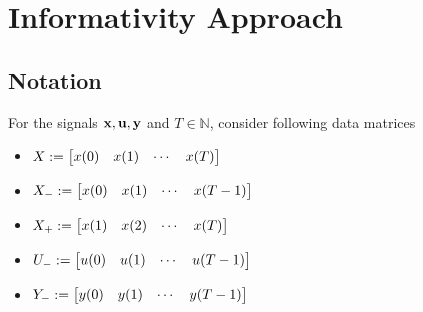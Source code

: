 \chapter{Informativity Approach}\doublespacing %
\label{chap:informativityapproach} %
\section*{Notation}
For the signals $\mathbf{x}, \mathbf{u}, \mathbf{y}$ and $T\in\mathbb{N}$, consider following data matrices
	\begin{itemize}
	\item $X := \begin{bmatrix} x(0) & x(1) & \cdots & x(T)\end{bmatrix}$
	\item $X_- := \begin{bmatrix} x(0) & x(1) & \cdots & x(T-1) \end{bmatrix}$
	\item $X_+ := \begin{bmatrix} x(1) & x(2) & \cdots & x(T) \end{bmatrix}$
	\item $U_- := \begin{bmatrix} u(0) & u(1) & \cdots & u(T-1)\end{bmatrix}$
	\item $Y_- := \begin{bmatrix} y(0) & y(1) & \cdots & y(T-1)\end{bmatrix}$
	\end{itemize}
